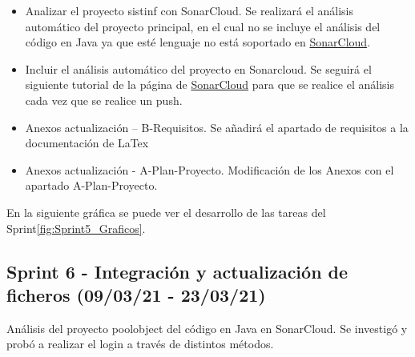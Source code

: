 \begin{itemize}
	 \item Analizar el proyecto sistinf con SonarCloud. 
	 	Se realizará el análisis automático del proyecto principal, en el cual no se incluye el análisis del código en Java ya que esté lenguaje no está soportado en \href{https://sonarcloud.io/}{SonarCloud}.
	 \item Incluir el análisis automático del proyecto en Sonarcloud. 
	 	Se seguirá el siguiente tutorial de la página de \href{https://sonarcloud.io/}{SonarCloud} para que se realice el análisis cada vez que se realice un push.  
	 \item Anexos actualización – B-Requisitos. 
	 	Se añadirá el apartado de requisitos a la documentación de LaTex
	 \item Anexos actualización - A-Plan-Proyecto.
	  	Modificación de los Anexos con el apartado A-Plan-Proyecto.	
	
\end{itemize}

En la siguiente gráfica se puede ver el desarrollo de las tareas del Sprint\ref{fig:Sprint5_Graficos}.


\subsection{Sprint 6 - Integración y actualización de ficheros (09/03/21 - 23/03/21)}
Análisis del proyecto poolobject del código en Java en SonarCloud. Se investigó y probó a realizar el login a través de distintos métodos.

